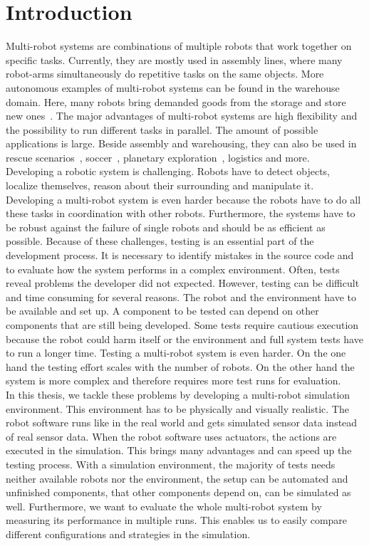 \chapter{Introduction}

Multi-robot systems are combinations of multiple robots that work together on specific tasks. Currently, they are mostly used in assembly lines, where many robot-arms simultaneously do repetitive tasks on the same objects. More autonomous examples of multi-robot systems can be found in the warehouse domain. Here, many robots bring demanded goods from the storage and store new ones~\cite{Kiva}. The major advantages of multi-robot systems are high flexibility and the possibility to run different tasks in parallel. The amount of possible applications is large. Beside assembly and warehousing, they can also be used in rescue scenarios~\cite{mas_rescue}, soccer~\cite{mas_soccer}, planetary exploration~\cite{mas_space}, logistics and more.\\
Developing a robotic system is challenging. Robots have to detect objects, localize themselves, reason about their surrounding and manipulate it. Developing a multi-robot system is even harder because the robots have to do all these tasks in coordination with other robots. Furthermore, the systems have to be robust against the failure of single robots and should be as efficient as possible. Because of these challenges, testing is an essential part of the development process. It is necessary to identify mistakes in the source code and to evaluate how the system performs in a complex environment. Often, tests reveal problems the developer did not expected. However, testing can be difficult and time consuming for several reasons. The robot and the environment have to be available and set up. A component to be tested can depend on other components that are still being developed. Some tests require cautious execution because the robot could harm itself or the environment and full system tests have to run a longer time. Testing a multi-robot system is even harder. On the one hand the testing effort scales with the number of robots. On the other hand the system is more complex and therefore requires more test runs for evaluation.\\
In this thesis, we tackle these problems by developing a multi-robot simulation environment. This environment has to be physically and visually realistic. The robot software runs like in the real world and gets simulated sensor data instead of real sensor data. When the robot software uses actuators, the actions are executed in the simulation. This brings many advantages and can speed up the testing process. With a simulation environment, the majority of tests needs neither available robots nor the environment, the setup can be automated and unfinished components, that other components depend on, can be simulated as well. Furthermore, we want to evaluate the whole multi-robot system by measuring its performance in multiple runs. This enables us to easily compare different configurations and strategies in the simulation.\\
